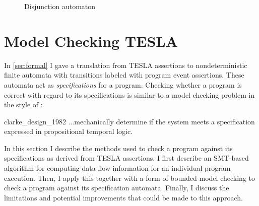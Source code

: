 \begin{figure}[ht]
  \centering
  \caption{Disjunction automaton}
  \label{fig:disj-auto}
\end{figure}

\section{Model Checking TESLA} \label{sec:checking}

In \autoref{sec:formal} I gave a translation from TESLA assertions to
nondeterministic finite automata with transitions labeled with program
event assertions. These automata act as \emph{specifications} for a
program. Checking whether a program is correct with regard to its
specifications is similar to a model checking problem in the style of
\textcite{clarke_design_1982}:

\begin{displaycquote}[p. 2]{clarke_design_1982}
  ...mechanically determine if the system meets a specification expressed in
  propositional temporal logic.
\end{displaycquote}

In this section I describe the methods used to check a program against
its specifications as derived from TESLA assertions. I first describe an
SMT-based algorithm for computing data flow information for an
individual program execution. Then, I apply this together with a form of
bounded model checking to check a program against its specification
automata. Finally, I discuss the limitations and potential improvements
that could be made to this approach.

